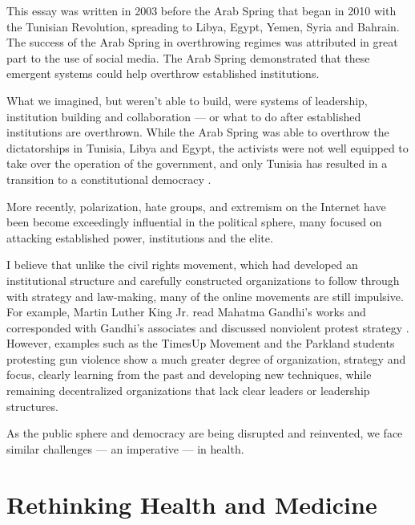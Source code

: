 This essay was written in 2003 before the Arab Spring that began in 2010 with the Tunisian Revolution, spreading to Libya, Egypt, Yemen, Syria and Bahrain. The success of the Arab Spring in overthrowing regimes was attributed in great part to the use of social media. The Arab Spring demonstrated that these emergent systems could help overthrow established institutions.

What we imagined, but weren't able to build, were systems of leadership, institution building and collaboration --- or what to do after established institutions are overthrown. While the Arab Spring was able to overthrow the dictatorships in Tunisia, Libya and Egypt, the activists were not well equipped to take over the operation of the government, and only Tunisia has resulted in a transition to a constitutional democracy \cite{ruthven2016understand}.

More recently, polarization, hate groups, and extremism on the Internet have been become exceedingly influential in the political sphere, many focused on attacking established power, institutions and the elite.

I believe that unlike the civil rights movement, which had developed an institutional structure and carefully constructed organizations to follow through with strategy and law-making, many of the online movements are still impulsive. For example, Martin Luther King Jr. read  Mahatma Gandhi's works and corresponded with Gandhi's associates and discussed nonviolent protest strategy \cite{reddick}. However, examples such as the TimesUp Movement and the Parkland students protesting gun violence show a much greater degree of organization, strategy and focus, clearly learning from the past and developing new techniques, while remaining decentralized organizations that lack clear leaders or leadership structures.

As the public sphere and democracy are being disrupted and reinvented, we face similar challenges --- an imperative --- in health.

\section{Rethinking Health and Medicine}
\label{requiringhealth}

